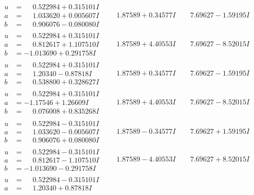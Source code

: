\documentclass[1p]{elsarticle_modified}
\theoremstyle{definition}
\begin{document}
$$\begin{array}{c|c|c}
\begin{aligned}
u &= \phantom{-}0.522984 + 0.315101 I \\
a &= \phantom{-}1.033620 + 0.005607 I \\
b &= \phantom{-}0.906076 - 0.080080 I\end{aligned}
 & \phantom{-}1.87589 + 0.34577 I & \phantom{-}7.69627 - 1.59195 I \\ \hline\begin{aligned}
u &= \phantom{-}0.522984 + 0.315101 I \\
a &= \phantom{-}0.812617 + 1.107510 I \\
b &= -1.013690 + 0.291758 I\end{aligned}
 & \phantom{-}1.87589 + 4.40553 I & \phantom{-}7.69627 - 8.52015 I \\ \hline\begin{aligned}
u &= \phantom{-}0.522984 + 0.315101 I \\
a &= \phantom{-}1.20340 - 0.87818 I \\
b &= \phantom{-}0.538800 + 0.328627 I\end{aligned}
 & \phantom{-}1.87589 + 0.34577 I & \phantom{-}7.69627 - 1.59195 I \\ \hline\begin{aligned}
u &= \phantom{-}0.522984 + 0.315101 I \\
a &= -1.17546 + 1.26609 I \\
b &= \phantom{-}0.076008 + 0.835268 I\end{aligned}
 & \phantom{-}1.87589 + 4.40553 I & \phantom{-}7.69627 - 8.52015 I \\ \hline\begin{aligned}
u &= \phantom{-}0.522984 - 0.315101 I \\
a &= \phantom{-}1.033620 - 0.005607 I \\
b &= \phantom{-}0.906076 + 0.080080 I\end{aligned}
 & \phantom{-}1.87589 - 0.34577 I & \phantom{-}7.69627 + 1.59195 I \\ \hline\begin{aligned}
u &= \phantom{-}0.522984 - 0.315101 I \\
a &= \phantom{-}0.812617 - 1.107510 I \\
b &= -1.013690 - 0.291758 I\end{aligned}
 & \phantom{-}1.87589 - 4.40553 I & \phantom{-}7.69627 + 8.52015 I \\ \hline\begin{aligned}
u &= \phantom{-}0.522984 - 0.315101 I \\
a &= \phantom{-}1.20340 + 0.87818 I \\

\end{aligned}
\end{array}$$
\end{document}
